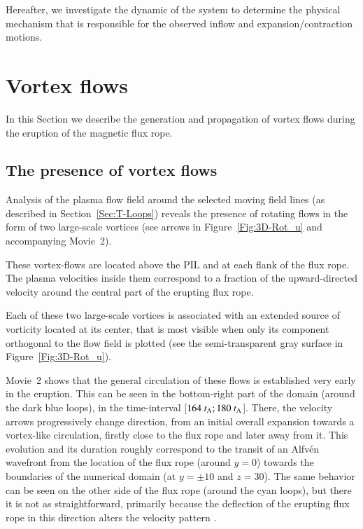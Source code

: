 \documentclass[apj]{emulateapj}
\newcommand{\tA}{t_{\rm A}}
\begin{document}
Hereafter, we investigate the dynamic of the system to determine the physical mechanism that is responsible for the observed inflow  and expansion/contraction motions.

\section{Vortex flows}
\label{Sec:T-Vortex}

In this Section we describe the generation and propagation of vortex flows during the eruption of the magnetic flux rope. 

\subsection{The presence of vortex flows}

Analysis of the plasma flow field around the selected moving field lines (as described in Section~\ref{Sec:T-Loops}) reveals the presence of rotating flows in the form of two large-scale vortices (see arrows in Figure~\ref{Fig:3D-Rot_u} and accompanying Movie~2). 

These vortex-flows are located above the PIL and at each flank of the flux rope. The plasma velocities inside them correspond to a fraction of the upward-directed velocity around the central part of the erupting flux rope. 

Each of these two large-scale vortices is associated with an extended source of vorticity located at its center, that is most visible when only its component orthogonal to the flow field is plotted (see the semi-transparent gray surface in Figure~\ref{Fig:3D-Rot_u}).

Movie~2 shows that the general circulation of these flows is established very early in the eruption. This can be seen in the bottom-right part of the domain (around the dark blue loops), in the time-interval [$164~\tA ; 180~\tA$]. There, the velocity arrows progressively  change direction, from an initial overall expansion towards a vortex-like circulation, firstly close to the flux rope and later away from it.  This evolution and its duration roughly correspond to the transit of an Alfv\'{e}n wavefront from the location of the flux rope (around $y=0$) towards the boundaries of the numerical domain (at $y=\pm10$ and $z=30$). The same behavior can be seen on the other side of the flux rope (around the cyan loops), but there it is not as straightforward, primarily because the deflection  of the erupting flux rope in this direction alters the velocity pattern \citep[see][ for more detail on the flux rope's deflection]{Zuc2015}. 
\end{document}
